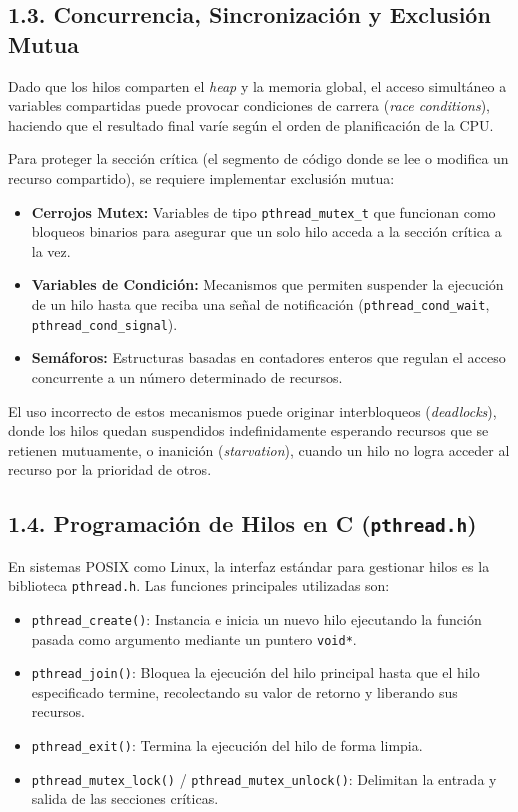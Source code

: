 \documentclass{article}
\begin{document}
\subsection*{1.3. Concurrencia, Sincronización y Exclusión Mutua}
Dado que los hilos comparten el \textit{heap} y la memoria global, el acceso simultáneo a variables compartidas puede provocar condiciones de carrera (\textit{race conditions}), haciendo que el resultado final varíe según el orden de planificación de la CPU.

Para proteger la sección crítica (el segmento de código donde se lee o modifica un recurso compartido), se requiere implementar exclusión mutua:
\begin{itemize}
    \item \textbf{Cerrojos Mutex:} Variables de tipo \texttt{pthread\_mutex\_t} que funcionan como bloqueos binarios para asegurar que un solo hilo acceda a la sección crítica a la vez.
    \item \textbf{Variables de Condición:} Mecanismos que permiten suspender la ejecución de un hilo hasta que reciba una señal de notificación (\texttt{pthread\_cond\_wait}, \texttt{pthread\_cond\_signal}).
    \item \textbf{Semáforos:} Estructuras basadas en contadores enteros que regulan el acceso concurrente a un número determinado de recursos.
\end{itemize}

El uso incorrecto de estos mecanismos puede originar interbloqueos (\textit{deadlocks}), donde los hilos quedan suspendidos indefinidamente esperando recursos que se retienen mutuamente, o inanición (\textit{starvation}), cuando un hilo no logra acceder al recurso por la prioridad de otros.

\subsection*{1.4. Programación de Hilos en C (\texttt{pthread.h})}
En sistemas POSIX como Linux, la interfaz estándar para gestionar hilos es la biblioteca \texttt{pthread.h}. Las funciones principales utilizadas son:
\begin{itemize}
    \item \texttt{pthread\_create()}: Instancia e inicia un nuevo hilo ejecutando la función pasada como argumento mediante un puntero \texttt{void*}.
    \item \texttt{pthread\_join()}: Bloquea la ejecución del hilo principal hasta que el hilo especificado termine, recolectando su valor de retorno y liberando sus recursos.
    \item \texttt{pthread\_exit()}: Termina la ejecución del hilo de forma limpia.
    \item \texttt{pthread\_mutex\_lock()} / \texttt{pthread\_mutex\_unlock()}: Delimitan la entrada y salida de las secciones críticas.
\end{itemize}
\end{document}
